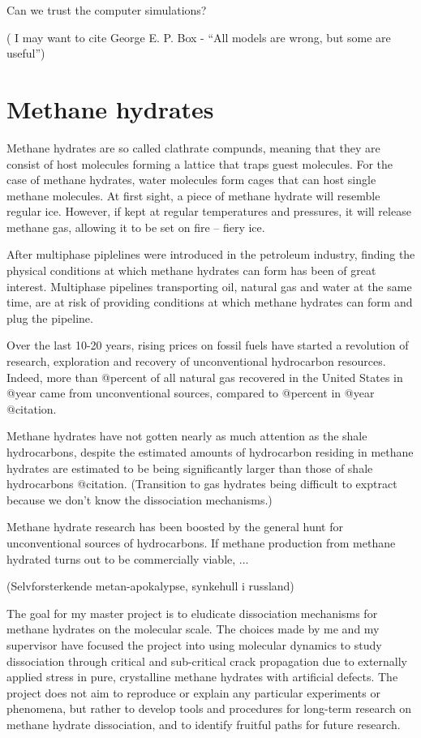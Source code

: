 Can we trust the computer simulations?

( I may want to cite George E. P. Box - ``All models are wrong, but some are useful'')

\section{Methane hydrates}
Methane hydrates are so called clathrate compunds, meaning that they are consist of host molecules forming a lattice that traps guest molecules. For the case of methane hydrates, water molecules form cages that can host single methane molecules. At first sight, a piece of methane hydrate will resemble regular ice. However, if kept at regular temperatures and pressures, it will release methane gas, allowing it to be set on fire -- fiery ice. 

After multiphase piplelines were introduced in the petroleum industry, finding the physical conditions at which methane hydrates can form has been of great interest. Multiphase pipelines transporting oil, natural gas and water at the same time, are at risk of providing conditions at which methane hydrates can form and plug the pipeline. 

Over the last 10-20 years, rising prices on fossil fuels have started a revolution of research, exploration and recovery of unconventional hydrocarbon resources. Indeed, more than @percent of all natural gas recovered in the United States in @year came from unconventional sources, compared to @percent in @year @citation. 

Methane hydrates have not gotten nearly as much attention as the shale hydrocarbons, despite the estimated amounts of hydrocarbon residing in methane hydrates are estimated to be being significantly larger than those of shale hydrocarbons @citation. 
(Transition to gas hydrates being difficult to exptract because we don't know the dissociation mechanisms.)

Methane hydrate research has been boosted by the general hunt for unconventional sources of hydrocarbons. If methane production from methane hydrated turns out to be commercially viable, ...

(Selvforsterkende metan-apokalypse, synkehull i russland)

The goal for my master project is to eludicate dissociation mechanisms for methane hydrates on the molecular scale. The choices made by me and my supervisor have focused the project into using molecular dynamics to study dissociation through critical and sub-critical crack propagation due to externally applied stress in pure, crystalline methane hydrates with artificial defects. The project does not aim to reproduce or explain any particular experiments or phenomena, but rather to develop tools and procedures for long-term research on methane hydrate dissociation, and to identify fruitful paths for future research.

